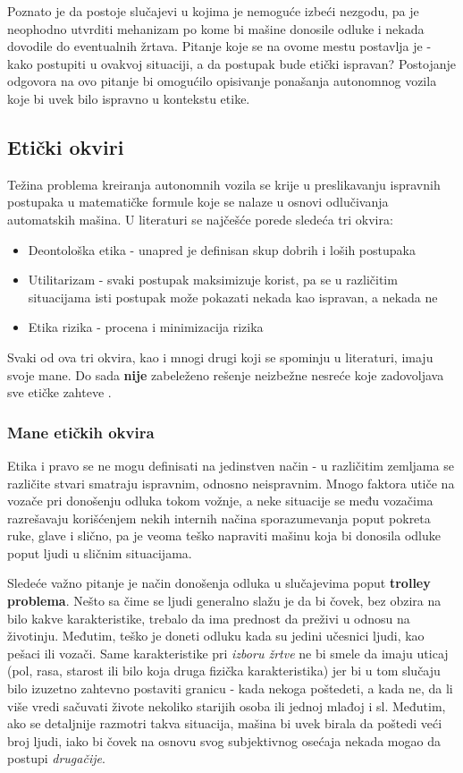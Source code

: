 \documentclass[a4paper]{article}
\begin{document}
Poznato je da postoje slučajevi u kojima je nemoguće izbeći nezgodu, pa je neophodno utvrditi mehanizam po kome bi mašine donosile odluke i nekada dovodile do eventualnih žrtava. Pitanje koje se na ovome mestu postavlja je - kako postupiti u ovakvoj situaciji, a da postupak bude etički ispravan? Postojanje odgovora na ovo pitanje bi omogućilo opisivanje ponašanja autonomnog vozila koje bi uvek bilo ispravno u kontekstu etike.

\subsection{Etički okviri}
\label{subsec:Etički okviri}
Težina problema kreiranja autonomnih vozila se krije u preslikavanju ispravnih postupaka u matematičke formule koje se nalaze u osnovi odlučivanja automatskih mašina. U literaturi se najčešće porede sledeća tri okvira:
\begin{itemize}
 \item {Deontološka etika - unapred je definisan skup dobrih i loših postupaka}
 \item {Utilitarizam - svaki postupak maksimizuje korist, pa se u različitim situacijama isti postupak može pokazati nekada kao ispravan, a nekada ne }
 \item {Etika rizika - procena i minimizacija rizika}
\end{itemize}
Svaki od ova tri okvira, kao i mnogi drugi koji se spominju u literaturi, imaju svoje mane. Do sada \textbf{nije} zabeleženo rešenje neizbežne nesreće koje zadovoljava sve etičke zahteve \cite{trolley_problem}.

\subsubsection{Mane etičkih okvira}
\label{subsubsec:Mane etičkih okvira}
Etika i pravo se ne mogu definisati na jedinstven način - u različitim zemljama se različite stvari smatraju ispravnim, odnosno neispravnim. Mnogo faktora utiče na vozače pri donošenju odluka tokom vožnje, a neke situacije se među vozačima razrešavaju korišćenjem nekih internih načina sporazumevanja poput pokreta ruke, glave i slično, pa je veoma teško napraviti mašinu koja bi donosila odluke poput ljudi u sličnim situacijama.

Sledeće važno pitanje je način donošenja odluka u slučajevima poput \textbf{trolley problema}. Nešto sa čime se ljudi generalno slažu je da bi čovek, bez obzira na bilo kakve karakteristike, trebalo da ima prednost da preživi u odnosu na životinju. Međutim, teško je doneti odluku kada su jedini učesnici ljudi, kao pešaci ili vozači. Same karakteristike pri \emph{izboru žrtve} ne bi smele da imaju uticaj (pol, rasa, starost ili bilo koja druga fizička karakteristika) jer bi u tom slučaju bilo izuzetno zahtevno postaviti granicu - kada nekoga poštedeti, a kada ne, da li više vredi sačuvati živote nekoliko starijih osoba ili jednoj mlađoj i sl. Međutim, ako se detaljnije razmotri takva situacija, mašina bi uvek birala da poštedi veći broj ljudi, iako bi čovek na osnovu svog subjektivnog osećaja nekada mogao da postupi \emph{drugačije}.
\end{document}
